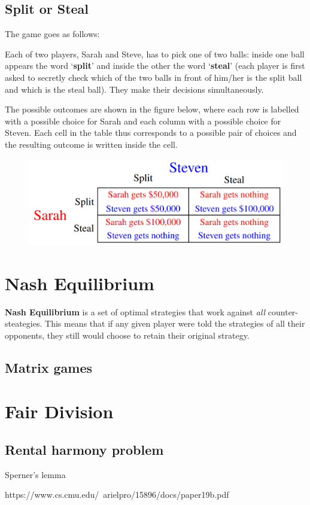 \subsection{Split or Steal}
The game goes as follows:
\begin{ebox}
Each of two players, Sarah and Steve, has to pick one of two balls: inside one ball appears the word ‘\textbf{split}’ and inside the other the word ‘\textbf{steal}’ (each player is first asked to secretly check which of the two balls in front of him/her is the split ball and which is the steal ball). They make their decisions simultaneously. 
\end{ebox}

The possible outcomes are shown in the figure below, where each row is labelled with a possible choice for Sarah and each column with a possible choice for Steven. Each cell in the table thus corresponds to a possible pair of choices and the resulting outcome is written inside the cell.

\begin{figure}[H]
    \centering
    \includegraphics[width=12cm]{images/Split_or_steal.png}
\end{figure}

\section{Nash Equilibrium}
\textbf{Nash Equilibrium} is a set of optimal strategies that work against \textit{all} counter-steategies. This means that if any given player were told the strategies of all their opponents, they still would choose to retain their original strategy. 

\subsection{Matrix games}

\section{Fair Division}
\subsection{Rental harmony problem}
Sperner's lemma

https://www.cs.cmu.edu/~arielpro/15896/docs/paper19b.pdf
